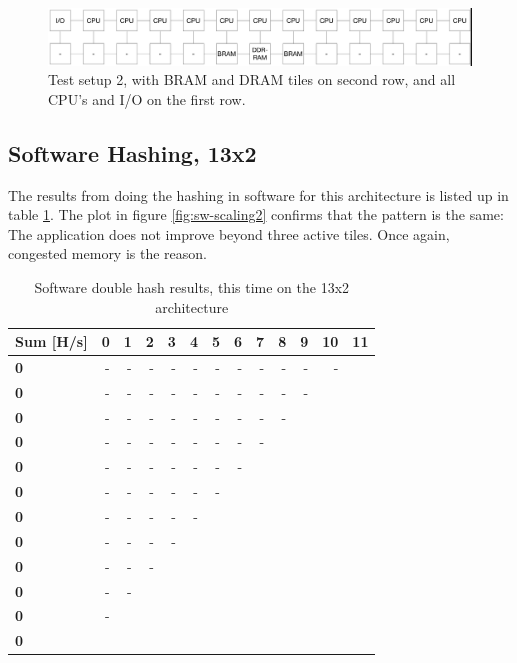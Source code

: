 \begin{appendix}
\begin{figure}[htb]
    \centering
    \includegraphics[width=1.0\textwidth]{Figures/Measurements/13x2}
    \caption{Test setup 2, with BRAM and DRAM tiles on second row, and all CPU's and I/O on the first row.}
    \label{fig:13x2-2}
\end{figure}

\subsection{Software Hashing, 13x2}

The results from doing the hashing in software for this architecture is listed up in table \ref{tab:Full-Perf-SW2}. 
The plot in figure \ref{fig:sw-scaling2} confirms that the pattern is the same: The application does not improve beyond three active tiles.
Once again, congested memory is the reason.


\begin{table}
\begin{tabular}{| l || r r r r r r r r r r r r |}
  \hline 
  \textbf{Sum} [H/s] & \textbf{0} & \textbf{1} & \textbf{2} & \textbf{3} & \textbf{4} & \textbf{5} & \textbf{6} & \textbf{7} & \textbf{8} & \textbf{9} & \textbf{10} & \textbf{11}\\
  \hline                       
  \textbf{0} & - & - & - & - & - & - & - & - & - & - & - \\
  \textbf{0} & - & - & - & - & - & - & - & - & - & - \\
  \textbf{0} & - & - & - & - & - & - & - & - & - \\
  \textbf{0} & - & - & - & - & - & - & - & - \\
  \textbf{0} & - & - & - & - & - & - & - \\
  \textbf{0} & - & - & - & - & - & - \\
  \textbf{0} & - & - & - & - & - \\
  \textbf{0} & - & - & - & -\\
  \textbf{0} & - & - & -\\
  \textbf{0} & - & -\\
  \textbf{0} & -\\
  \textbf{0} \\
  \hline  
\end{tabular}
\caption{Software double hash results, this time on the 13x2 architecture}
\label{tab:Full-Perf-SW2}
\end{table}



\end{appendix}
